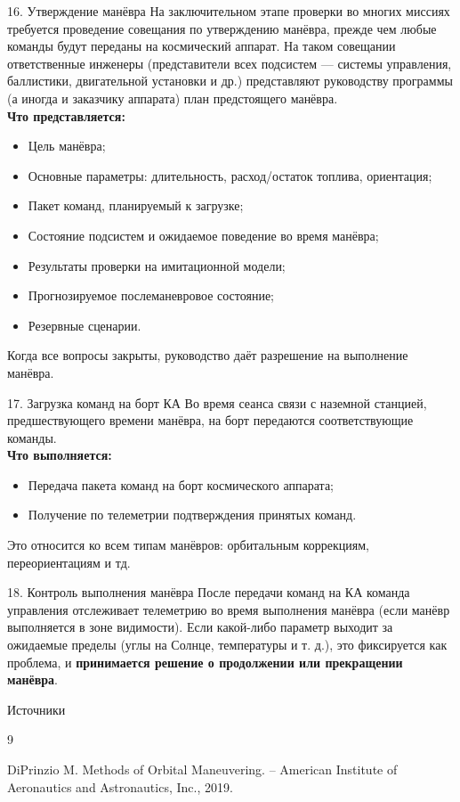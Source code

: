 \documentclass[8pt]{beamer}
\begin{document}
\begin{frame}{16. Утверждение манёвра}
На заключительном этапе проверки во многих миссиях требуется проведение совещания по утверждению манёвра, прежде чем любые команды будут переданы на космический аппарат. На таком совещании ответственные инженеры (представители всех подсистем — системы управления, баллистики, двигательной установки и др.) представляют руководству программы (а иногда и заказчику аппарата) план предстоящего манёвра. \\
\smallskip
\textbf{Что представляется:}
\begin{itemize}
    \item Цель манёвра;
    \item Основные параметры: длительность, расход/остаток топлива, ориентация;
    \item Пакет команд, планируемый к загрузке;
    \item Состояние подсистем и ожидаемое поведение во время манёвра;
    \item Результаты проверки на имитационной модели;
    \item Прогнозируемое послеманевровое состояние;
    \item Резервные сценарии.
\end{itemize}
Когда все вопросы закрыты, руководство даёт разрешение на выполнение манёвра.
\end{frame}

\begin{frame}{17. Загрузка команд на борт КА}
Во время сеанса связи с наземной станцией, предшествующего времени манёвра, на борт передаются соответствующие команды. \\
\smallskip
\textbf{Что выполняется:}
\begin{itemize}
    \item Передача пакета команд на борт космического аппарата;
    \item Получение по телеметрии подтверждения принятых команд.
\end{itemize}
Это относится ко всем типам манёвров: орбитальным коррекциям, переориентациям и тд.
\end{frame}

\begin{frame}{18. Контроль выполнения манёвра}
После передачи команд на КА команда управления отслеживает телеметрию во время выполнения манёвра (если манёвр выполняется в зоне видимости). Если какой-либо параметр выходит за ожидаемые пределы (углы на Солнце, температуры и т. д.), это фиксируется как проблема, и \textbf{принимается решение о продолжении или прекращении манёвра}.
\end{frame}

\begin{frame}[allowframebreaks]{Источники}
  \begin{thebibliography}{9}

    DiPrinzio M. Methods of Orbital Maneuvering. – American Institute of Aeronautics and Astronautics, Inc., 2019.
    
  \end{thebibliography}
\end{frame}
\end{document}
